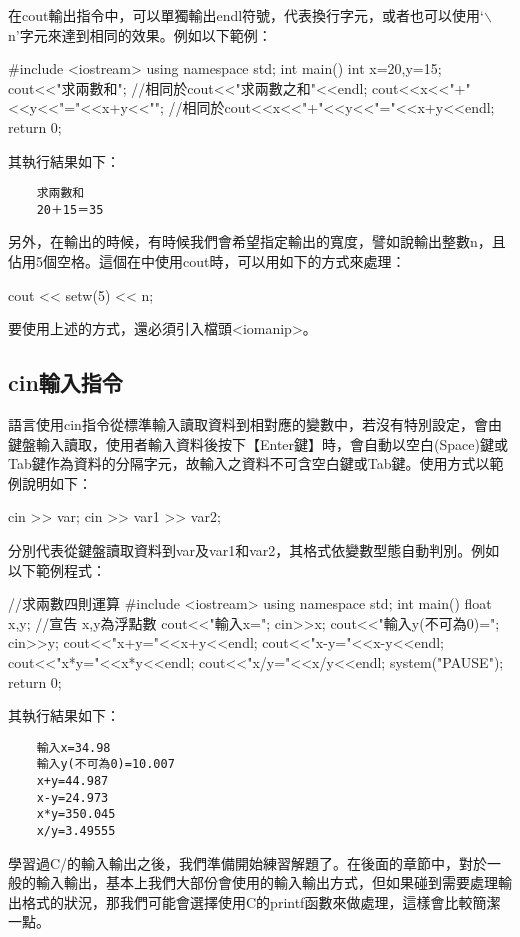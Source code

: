 在cout輸出指令中，可以單獨輸出endl符號，代表換行字元，或者也可以使用`$\backslash$n'字元來達到相同的效果。例如以下範例：
\begin{cppcode}
	#include <iostream>
	using namespace std;
	int main()
	{
		int x=20,y=15;
		cout<<"求兩數和\n";  
		//相同於cout<<"求兩數之和"<<endl;
		cout<<x<<"+"<<y<<"="<<x+y<<"\n";
		//相同於cout<<x<<"+"<<y<<"="<<x+y<<endl;
		return 0;
}	
\end{cppcode}
其執行結果如下：
\begin{Verbatim}
    求兩數和
    20＋15＝35
\end{Verbatim}

另外，在輸出的時候，有時候我們會希望指定輸出的寬度，譬如說輸出整數n，且佔用5個空格。這個在\cc{}中使用cout時，可以用如下的方式來處理：
\begin{inside}
	cout << setw(5) << n;
\end{inside}
要使用上述的方式，還必須引入檔頭<iomanip>。

\subsection{cin輸入指令}
\cc{}語言使用cin指令從標準輸入讀取資料到相對應的變數中，若沒有特別設定，會由鍵盤輸入讀取，使用者輸入資料後按下【Enter鍵】時，會自動以空白(Space)鍵或Tab鍵作為資料的分隔字元，故輸入之資料不可含空白鍵或Tab鍵。使用方式以範例說明如下：
\begin{inside}
	cin >> var;
	cin >> var1 >> var2;
\end{inside}
分別代表從鍵盤讀取資料到var及var1和var2，其格式依變數型態自動判別。例如以下範例程式：
\begin{cppcode}
//求兩數四則運算
#include <iostream>
using namespace std;
int main()
{
	float x,y;  //宣告 x,y為浮點數
	cout<<"輸入x=";
	cin>>x;
	cout<<"輸入y(不可為0)=";
	cin>>y;
	cout<<"x+y="<<x+y<<endl;
	cout<<"x-y="<<x-y<<endl;
	cout<<"x*y="<<x*y<<endl;
	cout<<"x/y="<<x/y<<endl;	
	system("PAUSE");
	return 0;				
}
\end{cppcode}
其執行結果如下：
\begin{Verbatim}
    輸入x=34.98
    輸入y(不可為0)=10.007
    x+y=44.987
    x-y=24.973
    x*y=350.045
    x/y=3.49555
\end{Verbatim}

學習過C/\cc{}的輸入輸出之後，我們準備開始練習解題了。在後面的章節中，對於一般的輸入輸出，基本上我們大部份會使用\cc{}的輸入輸出方式，但如果碰到需要處理輸出格式的狀況，那我們可能會選擇使用C的printf函數來做處理，這樣會比較簡潔一點。